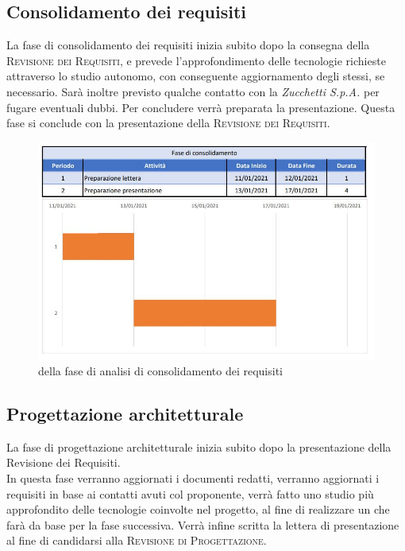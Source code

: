 \documentclass[../piano_di_progetto.tex]{subfiles}
\begin{document}
\subsection{Consolidamento dei requisiti}%
\label{sub:cons_req}
La fase di consolidamento dei requisiti inizia subito dopo la consegna della \textsc{Revisione dei Requisiti}, e prevede l’approfondimento delle tecnologie richieste attraverso lo studio autonomo, con conseguente aggiornamento degli stessi, se necessario. Sarà inoltre previsto qualche contatto con la \emph{Zucchetti S.p.A.} per fugare eventuali dubbi. Per concludere verrà preparata la presentazione. Questa fase si conclude con la presentazione della \textsc{Revisione dei Requisiti}.
\begin{figure}[H]
\centering
\includegraphics[width=12cm]{componenti/img/fase_consolid}
\caption{  della fase di analisi di consolidamento dei requisiti}
\end{figure}

\subsection{Progettazione architetturale}%
\label{sub:prog_arc}
La fase di progettazione architetturale inizia subito dopo la presentazione della Revisione dei Requisiti.\\
In questa fase verranno aggiornati i documenti redatti, verranno aggiornati i requisiti in base ai contatti avuti col proponente, verrà fatto uno studio più approfondito delle tecnologie coinvolte nel progetto, al fine di realizzare un  che farà da base per la fase successiva. Verrà infine scritta la lettera di presentazione al fine di candidarsi alla \textsc{Revisione di Progettazione}.
\end{document}
